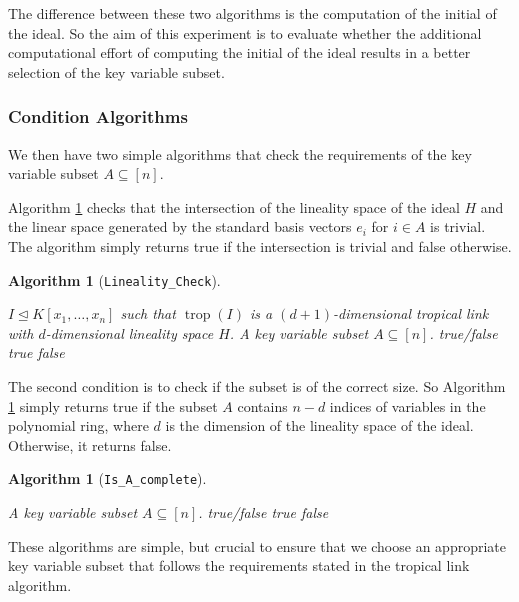 \documentclass[11pt,reqno,a4paper]{article}
\theoremstyle{theoremstyle}
\theoremstyle{examplestyle}
\theoremstyle{algorithmstyle}
\newtheorem{algorithm}[theorem]{Algorithm}
\numberwithin{equation}{subsection}
\DeclareMathOperator{\trop}{trop}
\begin{document}
The difference between these two algorithms is the computation of the initial of the ideal. So the aim of this experiment is to evaluate whether the additional computational effort of computing the initial of the ideal results in a better selection of the key variable subset. 

\subsubsection*{Condition Algorithms}

We then have two simple algorithms that check the requirements of the key variable subset $A \subseteq [n]$. 

Algorithm \ref{alg:IsAadmissible} checks that the intersection of the lineality space of the ideal $H$ and the linear space generated by the standard basis vectors $e_i$ for $i\in A$ is trivial. The algorithm simply returns true if the intersection is trivial and false otherwise. 

\begin{algorithm}[\texttt{Lineality\_Check}] \label{alg:IsAadmissible}\
\begin{algorithmic}[1]
    \REQUIRE $I \trianglelefteq K[x_1,\ldots,x_n]$ such that $\trop(I)$ is a $(d+1)$-dimensional tropical link with $d$-dimensional lineality space $H$. A key variable subset $A \subseteq [n]$.
    \ENSURE true/false
        \RETURN true
    \ELSE
        \RETURN false
    \ENDIF
\end{algorithmic}    
\end{algorithm}

The second condition is to check if the subset is of the correct size. So Algorithm \ref{alg:IsAdone} simply returns true if the subset $A$ contains $n-d$ indices of variables in the polynomial ring, where $d$ is the dimension of the lineality space of the ideal. Otherwise, it returns false.

\begin{algorithm}[\texttt{Is\_A\_complete}]\label{alg:IsAdone}\
\begin{algorithmic}[1]
    \REQUIRE A key variable subset $A \subseteq [n]$.
    \ENSURE true/false
    \IF{$|A | = n - d$}
        \RETURN true
    \ELSE
        \RETURN false
    \ENDIF
\end{algorithmic}    
\end{algorithm}

These algorithms are simple, but crucial to ensure that we choose an appropriate key variable subset that follows the requirements stated in the tropical link algorithm.
\end{document}
